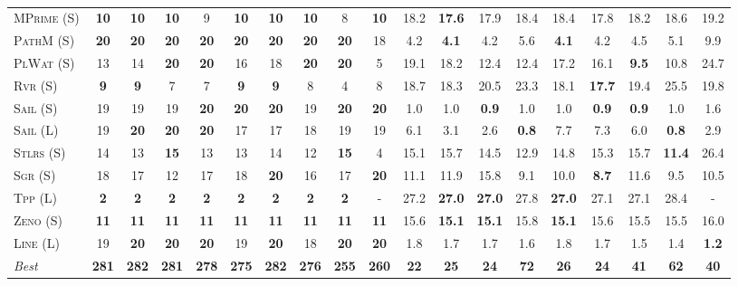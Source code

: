 \documentclass[11pt,landscape]{article}
\begin{document}
\begin{table}[tb]
{\begin{tabular}{|l||ccccccccc||ccccccccc||}
\textsc{MPrime} (S)&\textbf{10}&\textbf{10}&\textbf{10}&9&\textbf{10}&\textbf{10}&\textbf{10}&8&\textbf{10}&18.2&\textbf{17.6}&17.9&18.4&18.4&17.8&18.2&18.6&19.2\\
\textsc{PathM} (S)&\textbf{20}&\textbf{20}&\textbf{20}&\textbf{20}&\textbf{20}&\textbf{20}&\textbf{20}&\textbf{20}&18&4.2&\textbf{4.1}&4.2&5.6&\textbf{4.1}&4.2&4.5&5.1&9.9\\
\textsc{PlWat} (S)&13&14&\textbf{20}&\textbf{20}&16&18&\textbf{20}&\textbf{20}&5&19.1&18.2&12.4&12.4&17.2&16.1&\textbf{9.5}&10.8&24.7\\
\textsc{Rvr} (S)&\textbf{9}&\textbf{9}&7&7&\textbf{9}&\textbf{9}&8&4&8&18.7&18.3&20.5&23.3&18.1&\textbf{17.7}&19.4&25.5&19.8\\
\textsc{Sail} (S)&19&19&19&\textbf{20}&\textbf{20}&\textbf{20}&19&\textbf{20}&\textbf{20}&1.0&1.0&\textbf{0.9}&1.0&1.0&\textbf{0.9}&\textbf{0.9}&1.0&1.6\\
\textsc{Sail} (L)&19&\textbf{20}&\textbf{20}&\textbf{20}&17&17&18&19&19&6.1&3.1&2.6&\textbf{0.8}&7.7&7.3&6.0&\textbf{0.8}&2.9\\
\textsc{Stlrs} (S)&14&13&\textbf{15}&13&13&14&12&\textbf{15}&4&15.1&15.7&14.5&12.9&14.8&15.3&15.7&\textbf{11.4}&26.4\\
\textsc{Sgr} (S)&18&17&12&17&18&\textbf{20}&16&17&\textbf{20}&11.1&11.9&15.8&9.1&10.0&\textbf{8.7}&11.6&9.5&10.5\\
\textsc{Tpp} (L)&\textbf{2}&\textbf{2}&\textbf{2}&\textbf{2}&\textbf{2}&\textbf{2}&\textbf{2}&\textbf{2}&-&27.2&\textbf{27.0}&\textbf{27.0}&27.8&\textbf{27.0}&27.1&27.1&28.4&-\\
\textsc{Zeno} (S)&\textbf{11}&\textbf{11}&\textbf{11}&\textbf{11}&\textbf{11}&\textbf{11}&\textbf{11}&\textbf{11}&\textbf{11}&15.6&\textbf{15.1}&\textbf{15.1}&15.8&\textbf{15.1}&15.6&15.5&15.5&16.0\\
\textsc{Line} (L)&19&\textbf{20}&\textbf{20}&\textbf{20}&19&\textbf{20}&18&\textbf{20}&\textbf{20}&1.8&1.7&1.7&1.6&1.8&1.7&1.5&1.4&\textbf{1.2}
\\\hline
\textit{Best}&\textbf{281}&\textbf{282}&\textbf{281}&\textbf{278}&\textbf{275}&\textbf{282}&\textbf{276}&\textbf{255}&\textbf{260}&\textbf{22}&\textbf{25}&\textbf{24}&\textbf{72}&\textbf{26}&\textbf{24}&\textbf{41}&\textbf{62}&\textbf{40}\\\hline

        \end{tabular}}
        \caption{}
        \label{tab:table-2}
        \end{table}
        
\end{document}
